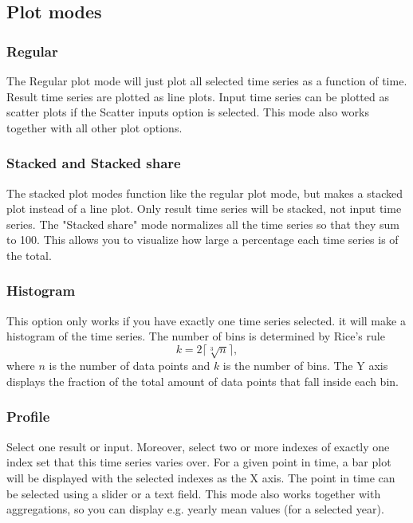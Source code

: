 \documentclass[11pt]{article}
\theoremstyle{definition}
\begin{document}
\subsection{Plot modes}

\subsubsection{Regular}

The Regular plot mode will just plot all selected time series as a function of time. Result time series are plotted as line plots. Input time series can be plotted as scatter plots if the Scatter inputs option is selected. This mode also works together with all other plot options.

\subsubsection{Stacked and Stacked share}

The stacked plot modes function like the regular plot mode, but makes a stacked plot instead of a line plot. Only result time series will be stacked, not input time series. The "Stacked share" mode normalizes all the time series so that they sum to 100. This allows you to visualize how large a percentage each time series is of the total.

\subsubsection{Histogram}

This option only works if you have exactly one time series selected. it will make a histogram of the time series. The number of bins is determined by %
Rice's rule %
\[
k = 2\lceil\sqrt[3]{n}\rceil,
\]
where $n$ is the number of data points and $k$ is the number of bins. The Y axis displays the fraction of the total amount of data points that fall inside each bin.

\subsubsection{Profile}

Select one result or input. Moreover, select two or more indexes of exactly one index set that this time series varies over. For a given point in time, a bar plot will be displayed with the selected indexes as the X axis. The point in time can be selected using a slider or a text field. This mode also works together with aggregations, so you can display e.g. yearly mean values (for a selected year).
\end{document}
